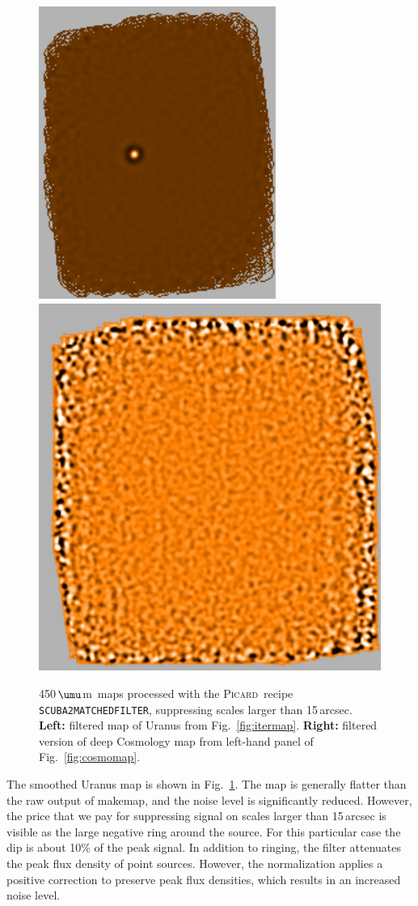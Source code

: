 \documentclass[twoside,11pt]{article}
\newcommand{\micron}{\mbox{\,${\umu}$m}}            %
\newcommand{\xref}[3]{#1}
\renewcommand{\_}{\texttt{\symbol{95}}}
\newcommand{\picard}{\xref{\textsc{Picard}}{sun231}{}}
\newcommand{\task}[1]{\textsf{#1}}
\newcommand{\makemap}{\xref{\task{makemap}}{sun258}{MAKEMAP}}
\begin{document}
\begin{figure}
\begin{center}
\includegraphics[width=0.46\linewidth]{sc19_uranus_filt}
\includegraphics[width=0.525\linewidth]{sc19_cosmo_map_filt}
\caption{450\micron\ maps processed with the \picard\ recipe
  \texttt{SCUBA2\_MATCHED\_FILTER}, suppressing scales larger than
  15\,arcsec. {\bf Left:} filtered map of Uranus from
  Fig.~\ref{fig:itermap}. {\bf Right:} filtered version of deep
  Cosmology map from left-hand panel of Fig.~\ref{fig:cosmomap}.}
\label{fig:cosmo_filt}
\end{center}
\end{figure}

The smoothed Uranus map is shown in Fig.~\ref{fig:cosmo_filt}. The map
is generally flatter than the raw output of \makemap, and the noise
level is significantly reduced. However, the price that we pay for
suppressing signal on scales larger than 15\,arcsec is visible as the
large negative ring around the source. For this particular case the
dip is about 10\% of the peak signal. In addition to ringing, the
filter attenuates the peak flux density of point sources. However, the
normalization applies a positive correction to preserve peak flux
densities, which results in an increased noise level.
\end{document}

